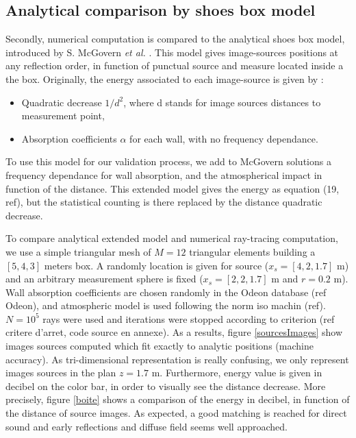\documentclass[AMA,STIX1COL]{WileyNJD-v2}
\begin{document}
\subsection{Analytical comparison by shoes box model}
Secondly, numerical computation is compared to the analytical shoes box model, introduced by S. McGovern \textit{et al.} \cite{mcgovern}. This model gives image-sources positions at any reflection order, in function of punctual source and measure located inside a the box. Originally, the energy associated to each image-source is given by :
\begin{itemize}
\item Quadratic decrease $1/d^2$, where d stands for image sources distances to measurement point,  
\item Absorption coefficients $\alpha$ for each wall, with no frequency dependance.
\end{itemize}
To use this model for our validation process, we add to McGovern solutions a frequency dependance for wall absorption, and the atmospherical impact in function of the distance. This extended model gives the energy as equation (19, ref), but the statistical counting is there replaced by the distance quadratic decrease.

To compare analytical extended model and numerical ray-tracing computation, we use a simple triangular mesh of $M=12$ triangular elements building a $[5,4,3]$ meters box. A randomly location is given for source ($x_s = [4,2,1.7]$ m) and an arbitrary measurement sphere is fixed ($x_s = [2,2,1.7]$ m and $r=0.2$ m). Wall absorption coefficients are chosen randomly in the Odeon database (ref Odeon), and atmospheric model is used following the norm iso machin (ref). $N = 10^ 5$ rays were used and iterations were stopped according to criterion (ref critere d'arret, code source en annexe). As a results, figure \ref{sourcesImages} show images sources computed which fit exactly to analytic positions (machine accuracy). As tri-dimensional representation is really confusing, we only represent images sources in the plan $z = 1.7$ m. Furthermore, energy value is given in decibel on the color bar, in order to visually see the distance decrease. More precisely, figure \ref{boite} shows a comparison of the energy in decibel, in function of the distance of source images. As expected, a good matching is reached for direct sound and early reflections and diffuse field seems well approached. 
 
\end{document}
